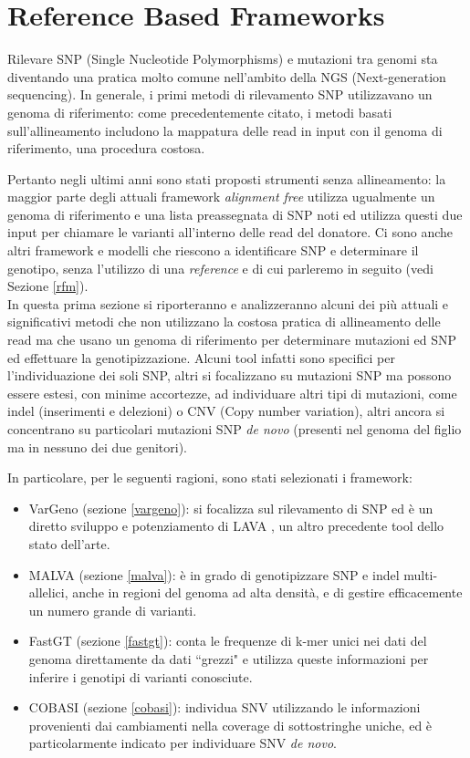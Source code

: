\documentclass[../main.tex]{subfiles}
\begin{document}
\section{Reference Based Frameworks}
\label{rbm}

Rilevare SNP (Single Nucleotide Polymorphisms) e mutazioni tra genomi sta diventando una pratica molto comune nell'ambito della NGS (Next-generation sequencing). In generale, i primi metodi di rilevamento SNP utilizzavano un genoma di riferimento: come precedentemente citato, i metodi basati sull'allineamento includono la mappatura delle read in input con il genoma di riferimento, una procedura costosa. 

Pertanto negli ultimi anni sono stati proposti strumenti senza allineamento: la maggior parte degli attuali framework \textit{alignment free} utilizza ugualmente un genoma di riferimento e una lista preassegnata di SNP noti ed utilizza questi due input per chiamare le varianti all'interno delle read del donatore. Ci sono anche altri framework e modelli che riescono a identificare SNP e determinare il genotipo, senza l'utilizzo di una \textit{reference} e di cui parleremo in seguito (vedi Sezione \ref{rfm}). \\

In questa prima sezione si riporteranno e analizzeranno alcuni dei più attuali e significativi metodi che non utilizzano la costosa pratica di allineamento delle read ma che usano un genoma di riferimento per determinare mutazioni ed SNP ed effettuare la genotipizzazione. Alcuni tool infatti sono specifici per l'individuazione dei soli SNP, altri si focalizzano su mutazioni SNP ma possono essere estesi, con minime accortezze, ad individuare altri tipi di mutazioni, come indel (inserimenti e delezioni) o CNV (Copy number variation), altri ancora si concentrano su particolari mutazioni SNP \textit{de novo} (presenti nel genoma del figlio ma in nessuno dei due genitori).

In particolare, per le seguenti ragioni, sono stati selezionati i framework:
\begin{itemize} 
\item VarGeno (sezione \ref{vargeno}): \cite{sun-medvedev2018vargeno} si focalizza sul rilevamento di SNP ed è un diretto sviluppo e potenziamento di LAVA \cite{shajii2016lava}, un altro precedente tool dello stato dell'arte.
\item MALVA (sezione \ref{malva}): \cite{bernardini2019malva} è in grado di genotipizzare SNP e indel multi-allelici, anche in regioni del genoma ad alta densità, e di gestire efficacemente un numero grande di varianti.
\item FastGT (sezione \ref{fastgt}): \cite{pajuste2017fastgt} conta le frequenze di k-mer unici nei dati del genoma direttamente da dati ``grezzi" e utilizza queste informazioni per inferire i genotipi di varianti conosciute. 
\item COBASI (sezione \ref{cobasi}): \cite{gomez-romero2018cobasi} individua SNV utilizzando le informazioni provenienti dai cambiamenti nella coverage di sottostringhe uniche, ed è particolarmente indicato per individuare SNV \textit{de novo}. 
\end{itemize} 
\end{document}
